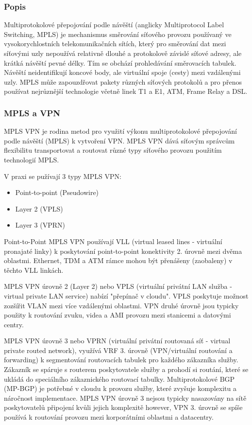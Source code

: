 \documentclass[thesis=B,czech]{FITthesis}[2012/06/26]
\begin{document}
      \subsubsection{Popis}

		  Multiprotokolové přepojování podle návěští (anglicky Multiprotocol Label Switching, MPLS) je mechanismus směrování síťového provozu používaný ve vysokorychlostních telekomunikačních sítích, který pro směrování dat mezi síťovými uzly nepoužívá relativně dlouhé a protokolově závislé síťové adresy, ale krátká návěští pevné délky.
		  Tím se obchází prohledávání směrovacích tabulek. Návěští neidentifikují koncové body, ale virtuální spoje (cesty) mezi vzdálenými uzly. MPLS může zapouzdřovat pakety různých síťových protokolů a pro přenos používat nejrůznější technologie včetně linek T1 a E1, ATM, Frame Relay a DSL.

      \subsubsection{MPLS a VPN}

		MPLS VPN je rodina metod pro využití výkonu multiprotokolové přepojování podle návěští (MPLS) k vytvoření VPN.
		MPLS VPN dává síťovým správcům flexibilitu transportovat a routovat různé typy síťového provozu použitím technologií MPLS.

		V praxi se pužívají 3 typy MPLS VPN:

		\begin{itemize}
		  \item Point-to-point (Pseudowire)
		  \item Layer 2 (VPLS)
		  \item Layer 3 (VPRN)
		\end{itemize}

		Point-to-Point MPLS VPN používají VLL (virtual leased lines - virtuální pronajaté linky) k poskytování point-to-point konektivity 2. úrovně mezi dvěma oblastmi. Ethernet, TDM a ATM rámce mohou být přenášeny (zaobaleny) v těchto VLL linkách.

		MPLS VPN úrovně 2 (Layer 2) nebo VPLS (virtuální privátní LAN služba - virtual private LAN service) nabízí "přepínač v cloudu". VPLS poskytuje možnost zozšířit VLAN mezi více vzdálenými oblastmi. VPN druhé úrovně jsou typicky použity k routování zvuku, videa a AMI provozu mezi stanicemi a datovými centry.

		MPLS VPN úrovně 3 nebo VPRN (virtuální privátní routovaná síť - virtual private routed network), využívá VRF 3. úrovně (VPN/virtuální routování a forwarding) k segmentování routovacích tabulek pro každého zákazníka služby.
		Zákazník se spáruje s routerem poskytovatele služby a prohodí si routání, které se ukládá do speciálního zákaznického routovací tabulky. Multiprotokolové BGP (MP-BGP) je potřebné v cloudu k provozu služby, které zvyšuje komplexitu a náročnost implementace.
		MPLS VPN úrovně 3 nejsou typicky nasazovány na sítě poskytovatelů připojení kvůli jejich komplexitě however, VPN 3. úrovně se spíše používá k routování provozu mezi korporátními oblastmi a datacentry.
		\cite{mpls_rfc}\cite{mpls_guide}
\end{document}
